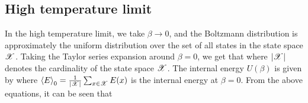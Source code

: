 \documentclass[letterpaper,english,10pt]{article}
\begin{document}
\subsection{High temperature limit}
In the high temperature limit, we take $\beta \to 0$, and the Boltzmann distribution is approximately the uniform distribution over the set of all states in the state space $\mathscr{X}$. 
Taking the Taylor series expansion around $\beta = 0$, we get that 
where $|\mathscr{X}|$ denotes the cardinality of the state space $\mathscr{X}$. 
The internal energy $U(\beta)$ is given by
where $\left\langle E \right\rangle_0 = \frac{1}{|\mathscr{X}|} \sum_{x \in \mathscr{X}} E(x)$ is the internal energy at $\beta=0$. 
From the above equations, it can be seen that
\end{document}
